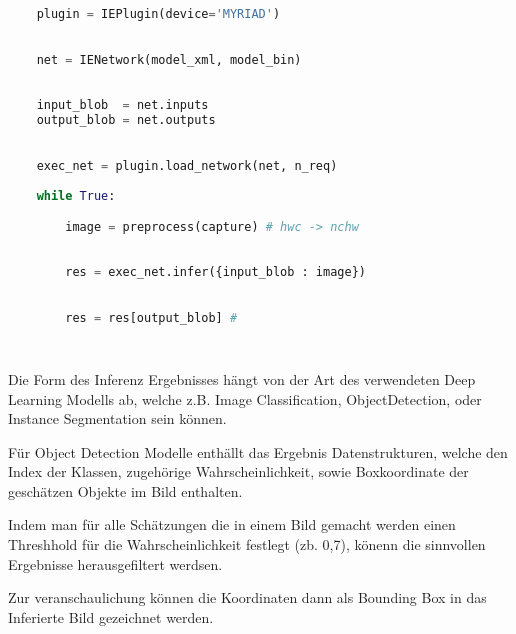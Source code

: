 \vspace{1cm}
\begin{minipage}{0.30\textwidth}
    \centering
    
    \label{fig:inger_engine_workflow}
\end{minipage}
\begin{minipage}{0.70\textwidth}

\begin{lstlisting}[language=Python]

    plugin = IEPlugin(device='MYRIAD')

        
    net = IENetwork(model_xml, model_bin)
        
    
    input_blob  = net.inputs
    output_blob = net.outputs
        

    exec_net = plugin.load_network(net, n_req)
        
    while True:

        image = preprocess(capture) # hwc -> nchw
        
        
        res = exec_net.infer({input_blob : image})
        

        res = res[output_blob] #
        
        
\end{lstlisting}
\vspace{1.5cm}
\end{minipage}
\vspace{1cm}



Die Form des Inferenz Ergebnisses hängt von der 
Art des verwendeten Deep Learning Modells ab, welche 
z.B. Image Classification, ObjectDetection, oder Instance
Segmentation sein können.

Für Object Detection Modelle enthällt das Ergebnis Datenstrukturen, 
welche den Index der Klassen, zugehörige Wahrscheinlichkeit, 
sowie Boxkoordinate der geschätzen Objekte im Bild enthalten.

Indem man für alle Schätzungen die in einem Bild gemacht werden 
einen Threshhold für die Wahrscheinlichkeit festlegt (zb. 0,7),
könenn die sinnvollen Ergebnisse herausgefiltert werdsen.

Zur veranschaulichung können die Koordinaten dann 
als Bounding Box in das Inferierte Bild gezeichnet werden.
